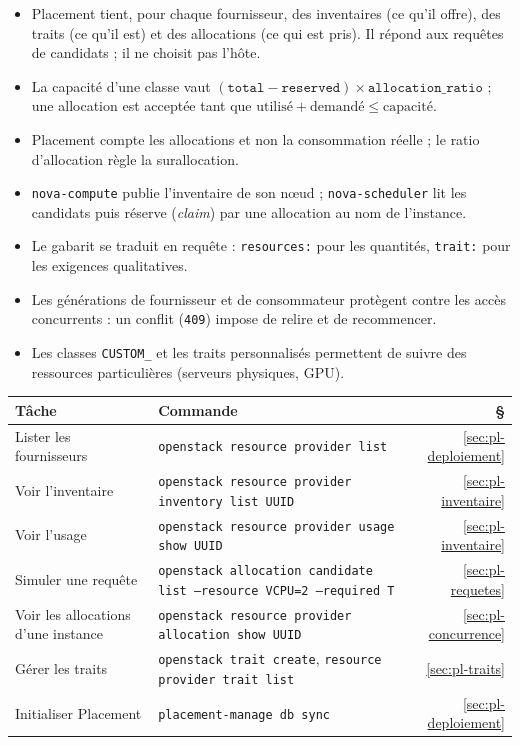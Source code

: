 \begin{aretenir}
\begin{itemize}
  \item Placement tient, pour chaque fournisseur, des inventaires (ce qu'il offre), des traits (ce qu'il est) et des
        allocations (ce qui est pris). Il répond aux requêtes de candidats ; il ne choisit pas l'hôte.
  \item La capacité d'une classe vaut $(\texttt{total}-\texttt{reserved})\times\texttt{allocation\_ratio}$ ; une allocation
        est acceptée tant que $\text{utilisé}+\text{demandé}\le\text{capacité}$.
  \item Placement compte les allocations et non la consommation réelle ; le ratio d'allocation règle la surallocation.
  \item \texttt{nova-compute} publie l'inventaire de son nœud ; \texttt{nova-scheduler} lit les candidats puis réserve
        (\emph{claim}) par une allocation au nom de l'instance.
  \item Le gabarit se traduit en requête : \texttt{resources:} pour les quantités, \texttt{trait:} pour les exigences
        qualitatives.
  \item Les générations de fournisseur et de consommateur protègent contre les accès concurrents : un conflit
        (\texttt{409}) impose de relire et de recommencer.
  \item Les classes \texttt{CUSTOM\_} et les traits personnalisés permettent de suivre des ressources particulières
        (serveurs physiques, GPU).
\end{itemize}
\end{aretenir}

\begin{center}
\renewcommand{\arraystretch}{1.35}
\begin{tabular}{@{}>{\raggedright\arraybackslash}p{4.0cm}>{\raggedright\arraybackslash}p{10.1cm}r@{}}
\toprule
\textbf{Tâche} & \textbf{Commande} & \textbf{§} \\
\midrule
Lister les fournisseurs & \texttt{openstack resource provider list} & \ref{sec:pl-deploiement} \\
Voir l'inventaire & \texttt{openstack resource provider inventory list UUID} & \ref{sec:pl-inventaire} \\
Voir l'usage & \texttt{openstack resource provider usage show UUID} & \ref{sec:pl-inventaire} \\
Simuler une requête & \texttt{openstack allocation candidate list --resource VCPU=2 --required T} & \ref{sec:pl-requetes} \\
Voir les allocations d'une instance & \texttt{openstack resource provider allocation show UUID} & \ref{sec:pl-concurrence} \\
Gérer les traits & \texttt{openstack trait create}, \texttt{resource provider trait list} & \ref{sec:pl-traits} \\
Initialiser Placement & \texttt{placement-manage db sync} & \ref{sec:pl-deploiement} \\
\bottomrule
\end{tabular}
\end{center}

